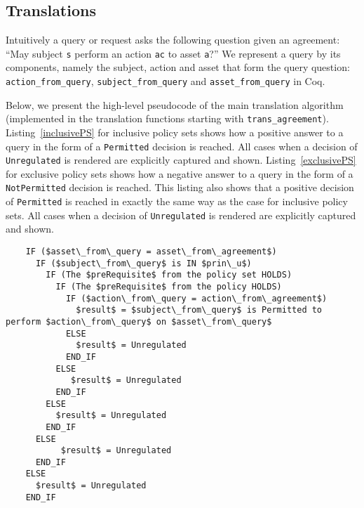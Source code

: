 \documentclass[runningheads,a4paper]{llncs}
\newcommand{\syn}{\texttt}
\begin{document}
\subsection{Translations}\label{sec:translationfuncs}

Intuitively a query or request asks the following question given an agreement: ``May subject \syn{s} perform an action \syn{ac} to asset \syn{a}?'' We represent a query by its components, namely the subject, action and asset that form the query question: \syn{action_from_query}, \syn{subject_from_query} and \syn{asset_from_query} in Coq. 

Below, we present the high-level pseudocode of the main translation algorithm (implemented in the translation functions starting with \syn{trans_agreement}).
%
Listing~\ref{inclusivePS} for inclusive policy sets shows how a positive answer to a query in the form of a \syn{Permitted} decision is reached. All cases when a decision of \syn{Unregulated} is rendered are explicitly captured and shown. Listing~\ref{exclusivePS} for exclusive policy sets shows how a negative answer to a query in the form of a \syn{NotPermitted} decision is reached. This listing also shows that a positive decision of \syn{Permitted} is reached in exactly the same way as the case for inclusive policy sets. All cases when a decision of \syn{Unregulated} is rendered are explicitly captured and shown.

\begin{lstlisting}
    IF ($asset\_from\_query = asset\_from\_agreement$)
      IF ($subject\_from\_query$ is IN $prin\_u$)
        IF (The $preRequisite$ from the policy set HOLDS)
          IF (The $preRequisite$ from the policy HOLDS)
            IF ($action\_from\_query = action\_from\_agreement$)
              $result$ = $subject\_from\_query$ is Permitted to perform $action\_from\_query$ on $asset\_from\_query$
            ELSE
              $result$ = Unregulated
            END_IF            
          ELSE
             $result$ = Unregulated
          END_IF
        ELSE
          $result$ = Unregulated
        END_IF
      ELSE
           $result$ = Unregulated
      END_IF
    ELSE
      $result$ = Unregulated
    END_IF
\end{lstlisting}
\end{document}
